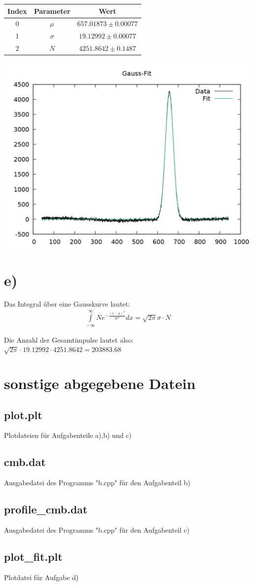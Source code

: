 \documentclass{scrreprt}
\begin{document}
\begin{center}
\begin{tabular}{ccc}
\toprule
Index & Parameter & Wert\\
\midrule
0 & $\mu$ & $657.01873 \pm 0.00077$\\
1 & $\sigma$ & $19.12992 \pm 0.00077$\\
2 & $N$ & $4251.8642 \pm 0.1487$\\
\bottomrule
\end{tabular}
\end{center}

\begin{center}
\includegraphics[scale=0.3]{d/plot_fit.png}
\end{center}

\section*{e)}
Das Integral über eine Gausskurve lautet:\\

\begin{align*}
\int\limits_{-\infty}^{\infty} Ne^{-\frac{(x-\mu)^2}{2\sigma^2}} dx = \sqrt{2\pi}\sigma\cdot N
\end{align*}

Die Anzahl der Gesamtimpulse lautet also: $\sqrt{2\pi}\cdot 19.12992\cdot 4251.8642 = 203883.68$

\section*{sonstige abgegebene Datein}
\subsection*{plot.plt}
Plotdateien für Aufgabenteile a),b) und c)
\subsection*{cmb.dat}
Ausgabedatei des Programms "b.cpp" für den Aufgabenteil b)
\subsection*{profile\_cmb.dat}
Ausgabedatei des Programms "b.cpp" für den Aufgabenteil c)
\subsection*{plot\_fit.plt}
Plotdatei für Aufgabe d)
\end{document}
